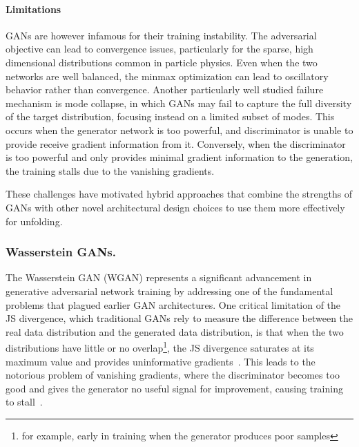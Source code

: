         \paragraph{Limitations}
            GANs are however infamous for their training instability.
            The adversarial objective can lead to convergence issues, particularly for the sparse, high dimensional distributions common in particle physics.
            Even when the two networks are well balanced, the minmax optimization can lead to oscillatory behavior rather than convergence.
            Another particularly well studied failure mechanism is mode collapse, in which GANs may fail to capture the full diversity of the target distribution, focusing instead on a limited subset of modes.
            This occurs when the generator network is too powerful, and discriminator is unable to provide receive gradient information from it.
            Conversely, when the discriminator is too powerful and only provides minimal gradient information to the generation, the training stalls due to the vanishing gradients.
            
            These challenges have motivated hybrid approaches that combine the strengths of GANs with other novel architectural design choices to use them more effectively for unfolding.

    \subsubsection{Wasserstein GANs.}
        The Wasserstein GAN (WGAN) represents a significant advancement in generative adversarial network training by addressing one of the fundamental problems that plagued earlier GAN architectures.
        One critical limitation of the JS divergence, which traditional GANs rely to measure the difference between the real data distribution and the generated data distribution, is that when the two distributions have little or no overlap\footnote{for example, early in training when the generator produces poor samples}, the JS divergence saturates at its maximum value and provides uninformative gradients~\cite{arjovsky_wasserstein_2017, gulrajani_improved_2017, arjovsky_towards_2017}.
        This leads to the notorious problem of vanishing gradients, where the discriminator becomes too good and gives the generator no useful signal for improvement, causing training to stall~\cite{goodfellow_nips_2017, salimans_improved_2016}.
        
